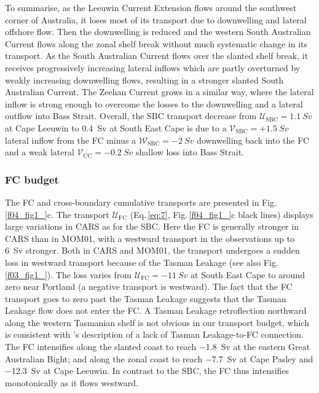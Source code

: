 \documentclass[preprint,3p,review,12pt]{elsarticle}
\newcommand{\citepos}[1]{\citeauthor{#1}'s \citeyearpar{#1}}
\newcommand{\sub}[1]{_{\text{#1}}}
\begin{document}
To summarise, as the Leeuwin Current Extension flows around the southwest corner of Australia, it loses most of its transport due to downwelling and lateral offshore flow.
Then the downwelling is reduced and the western South Australian Current flows along the zonal shelf break without much systematic change in its transport.
As the South Australian Current flows over the slanted shelf break, it receives progressively increasing lateral inflows which are partly overturned by weakly increasing downwelling flows, resulting in a stronger slanted South Australian Current\@.
The Zeehan Current grows
in a similar way,
where the lateral inflow is
strong enough to overcome the losses to the downwelling and a lateral outflow into
Bass Strait. Overall, the SBC transport decrease from $\mathcal{U}\sub{SBC} = \SI{1.1}{Sv}$
at Cape Leeuwin to \SI{0.4}{Sv} at South East Cape is due to a $\mathcal{V}\sub{SBC} = +\SI{1.5}{Sv}$ lateral inflow from the FC minus
a $\mathcal{W}\sub{SBC} = \SI{-2}{Sv}$ downwelling 
back into the FC and a weak lateral $\mathcal{V}\sub{CC} = \SI{-0.2}{Sv}$ shallow loss into Bass Strait.

\subsubsection{FC budget}\label{FC budget}
The FC and cross-boundary cumulative transports are presented in Fig.\,\ref{f04_fig1_}c.
The transport $\mathcal{U}\sub{FC}$ (Eq.\,\ref{eq:7}, Fig.\,\ref{f04_fig1_}c black lines) displays large variations in CARS
as for the SBC\@.
Here the FC is generally stronger in CARS than in MOM01, with a westward transport in the observations up to \SI{6}{Sv} stronger.
Both in CARS and MOM01,
the transport undergoes
a sudden loss in westward transport
because of the Tasman Leakage
(see also Fig.\,\ref{f03_fig1_}).
The loss varies from $\mathcal{U}\sub{FC} = \SI{-11}{Sv}$
at South East Cape to around zero near Portland (a negative transport is westward). 
The fact that the FC transport goes to zero past the Tasman Leakage suggests that the Tasman Leakage flow does not enter the FC. A Tasman Leakage retroflection northward along the western Tasmanian shelf is not obvious in our transport budget, which is consistent with \citepos{Speich2002,vanSebille2012,vanSebille2014} description of a lack of Tasman Leakage-to-FC connection.
The FC intensifies along the slanted coast to reach \SI{-1.8}{Sv} at the eastern Great Australian Bight; and along the zonal coast to reach \SI{-7.7}{Sv} at Cape Pasley and \SI{-12.3}{Sv} at Cape Leeuwin. In contrast to the SBC,
the FC thus intensifies monotonically as it flows westward.
\end{document}
